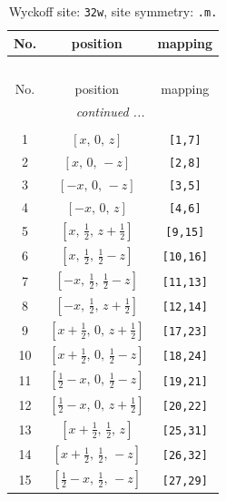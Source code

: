 \documentclass[fleqn,8pt]{jsarticle}
\begin{document}
\begin{longtable}{ccc}
\caption{Wyckoff site: {\tt 32w}, site symmetry: {\tt .m.}}
 \\
 \hline \hline
No. & position & mapping \\ \hline \endfirsthead

\multicolumn{2}{l}{\tablename\ \thetable{}} \\
 \hline \hline
No. & position & mapping \\ \hline \endhead

 \hline \hline
\multicolumn{2}{r}{\footnotesize\it continued ...} \\ \endfoot

 \hline \hline
\multicolumn{2}{r}{} \\ \endlastfoot

1 & $\left[ x,\, 0,\, z \right]$ & {\tt [1,7]} \\ \hline
2 & $\left[ x,\, 0,\, - z \right]$ & {\tt [2,8]} \\ \hline
3 & $\left[ - x,\, 0,\, - z \right]$ & {\tt [3,5]} \\ \hline
4 & $\left[ - x,\, 0,\, z \right]$ & {\tt [4,6]} \\ \hline
5 & $\left[ x,\, \frac{1}{2},\, z + \frac{1}{2} \right]$ & {\tt [9,15]} \\ \hline
6 & $\left[ x,\, \frac{1}{2},\, \frac{1}{2} - z \right]$ & {\tt [10,16]} \\ \hline
7 & $\left[ - x,\, \frac{1}{2},\, \frac{1}{2} - z \right]$ & {\tt [11,13]} \\ \hline
8 & $\left[ - x,\, \frac{1}{2},\, z + \frac{1}{2} \right]$ & {\tt [12,14]} \\ \hline
9 & $\left[ x + \frac{1}{2},\, 0,\, z + \frac{1}{2} \right]$ & {\tt [17,23]} \\ \hline
10 & $\left[ x + \frac{1}{2},\, 0,\, \frac{1}{2} - z \right]$ & {\tt [18,24]} \\ \hline
11 & $\left[ \frac{1}{2} - x,\, 0,\, \frac{1}{2} - z \right]$ & {\tt [19,21]} \\ \hline
12 & $\left[ \frac{1}{2} - x,\, 0,\, z + \frac{1}{2} \right]$ & {\tt [20,22]} \\ \hline
13 & $\left[ x + \frac{1}{2},\, \frac{1}{2},\, z \right]$ & {\tt [25,31]} \\ \hline
14 & $\left[ x + \frac{1}{2},\, \frac{1}{2},\, - z \right]$ & {\tt [26,32]} \\ \hline
15 & $\left[ \frac{1}{2} - x,\, \frac{1}{2},\, - z \right]$ & {\tt [27,29]} \\ \hline

\end{longtable}
\end{document}
